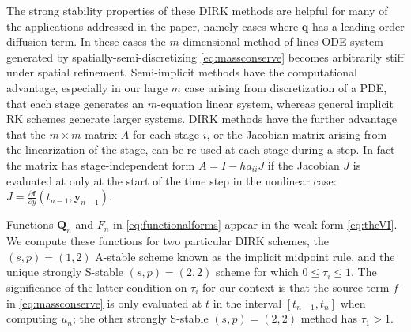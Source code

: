 \documentclass[final,leqno,onefignum,onetabnum]{siamltex1213bueler}
\newcommand\bbf{\mathbf{f}}
\newcommand\bq{\mathbf{q}}
\newcommand\by{\mathbf{y}}
\newcommand\bQ{\mathbf{Q}}
\begin{document}
The strong stability properties of these DIRK methods are helpful for many of the applications addressed in the paper, namely cases where $\bq$ has a leading-order diffusion term.  In these cases the $m$-dimensional method-of-lines ODE system generated by spatially-semi-discretizing \eqref{eq:massconserve} becomes arbitrarily stiff under spatial refinement.  Semi-implicit methods have the computational advantage, especially in our large $m$ case arising from discretization of a PDE, that each stage generates an $m$-equation linear system, whereas general implicit RK schemes generate larger systems.  DIRK methods have the further advantage that the $m\times m$ matrix $A$ for each stage $i$, or the Jacobian matrix arising from the linearization of the stage, can be re-used at each stage during a step.  In fact the matrix has stage-independent form $A = I - h a_{ii} J$ if the Jacobian $J$ is evaluated at only at the start of the time step in the nonlinear case: $J = \frac{\partial \bbf}{\partial y}(t_{n-1},\by_{n-1})$.

Functions $\bQ_n$ and $F_n$ in \eqref{eq:functionalforms} appear in the weak form \eqref{eq:theVI}.  We compute these functions for two particular DIRK schemes, the $(s,p)=(1,2)$ A-stable scheme known as the implicit midpoint rule, and the unique strongly S-stable $(s,p)=(2,2)$ scheme for which $0\le \tau_i\le 1$.  The significance of the latter condition on $\tau_i$ for our context is that the source term $f$ in \eqref{eq:massconserve} is only evaluated at $t$ in the interval $[t_{n-1},t_n]$ when computing $u_n$; the other strongly S-stable $(s,p)=(2,2)$ method has $\tau_1>1$.
\end{document}
